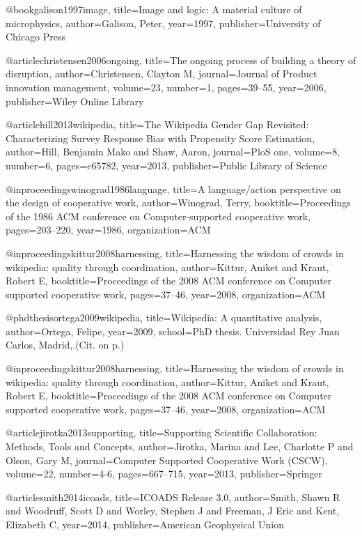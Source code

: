 @book{galison1997image,
  title={Image and logic: A material culture of microphysics},
  author={Galison, Peter},
  year={1997},
  publisher={University of Chicago Press}
}



@article{christensen2006ongoing,
  title={The ongoing process of building a theory of disruption},
  author={Christensen, Clayton M},
  journal={Journal of Product innovation management},
  volume={23},
  number={1},
  pages={39--55},
  year={2006},
  publisher={Wiley Online Library}
}


@article{hill2013wikipedia,
  title={The Wikipedia Gender Gap Revisited: Characterizing Survey Response Bias with Propensity Score Estimation},
  author={Hill, Benjamin Mako and Shaw, Aaron},
  journal={PloS one},
  volume={8},
  number={6},
  pages={e65782},
  year={2013},
  publisher={Public Library of Science}
}

@inproceedings{winograd1986language,
  title={A language/action perspective on the design of cooperative work},
  author={Winograd, Terry},
  booktitle={Proceedings of the 1986 ACM conference on Computer-supported cooperative work},
  pages={203--220},
  year={1986},
  organization={ACM}
}

@inproceedings{kittur2008harnessing,
  title={Harnessing the wisdom of crowds in wikipedia: quality through coordination},
  author={Kittur, Aniket and Kraut, Robert E},
  booktitle={Proceedings of the 2008 ACM conference on Computer supported cooperative work},
  pages={37--46},
  year={2008},
  organization={ACM}
}


@phdthesis{ortega2009wikipedia,
  title={Wikipedia: A quantitative analysis},
  author={Ortega, Felipe},
  year={2009},
  school={PhD thesis. Universidad Rey Juan Carlos, Madrid,.(Cit. on p.)}
}

@inproceedings{kittur2008harnessing,
  title={Harnessing the wisdom of crowds in wikipedia: quality through coordination},
  author={Kittur, Aniket and Kraut, Robert E},
  booktitle={Proceedings of the 2008 ACM conference on Computer supported cooperative work},
  pages={37--46},
  year={2008},
  organization={ACM}
}

@article{jirotka2013supporting,
  title={Supporting Scientific Collaboration: Methods, Tools and Concepts},
  author={Jirotka, Marina and Lee, Charlotte P and Olson, Gary M},
  journal={Computer Supported Cooperative Work (CSCW)},
  volume={22},
  number={4-6},
  pages={667--715},
  year={2013},
  publisher={Springer}
}

@article{smith2014icoads,
  title={ICOADS Release 3.0},
  author={Smith, Shawn R and Woodruff, Scott D and Worley, Stephen J and Freeman, J Eric and Kent, Elizabeth C},
  year={2014},
  publisher={American Geophysical Union}
}




